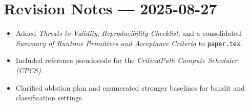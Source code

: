 \hypertarget{revision-notes-2025-08-27}{%
\section{Revision Notes --- 2025-08-27}}
\begin{itemize}
  \item Added \emph{Threats to Validity}, \emph{Reproducibility Checklist}, and a consolidated \emph{Summary of Runtime Primitives and Acceptance Criteria} to \texttt{paper.tex}.
  \item Included reference pseudocode for the \emph{Critical\-Path Compute Scheduler (CPCS)}.
  \item Clarified ablation plan and enumerated stronger baselines for bandit and classification settings.
\end{itemize}


